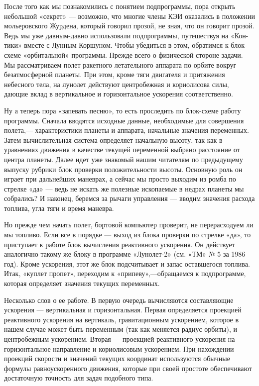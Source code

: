 \documentclass[11pt,a4paper,oneside]{article}
\begin{document}
После того как мы познакомились с понятием подпрограммы, пора открыть небольшой «секрет» — возможно, что многие члены КЭИ оказались в положении мольеровского Журдена, который говорил прозой, не зная, что он говорит прозой. Ведь мы уже давным-давно использовали подпрограммы, путешествуя на «Кон-тики» вместе с Лунным Коршуном. Чтобы убедиться в этом, обратимся к блок-схеме «орбитальной» программы. Прежде всего о физической стороне задачи. Мы рассматриваем полет ракетного летательного аппарата по орбите вокруг безатмосферной планеты. При этом, кроме тяги двигателя и притяжения небесного тела, на лунолет действуют центробежная и кориолисова силы, дающие вклад в вертикальное и горизонтальное ускорения соответственно.

Ну а теперь пора «запевать песню», то есть проследить по блок-схеме работу программы. Сначала вводятся исходные данные, необходимые для совершения полета,— характеристики планеты и аппарата, начальные значения переменных. Затем вычислительная система определяет начальную высоту, так как в уравнениях движения в качестве текущей переменной выбрано расстояние от центра планеты. Далее идет уже знакомый нашим читателям по предыдущему выпуску рубрики блок проверки положительности высоты. Основную роль он играет при дальнейших маневрах, а сейчас мы просто выходим из ромба по стрелке «да» — ведь не искать же полезные ископаемые в недрах планеты мы собрались? И наконец, беремся за рычаги управления — вводим значения расхода топлива, угла тяги и время маневра.

Но прежде чем начать полет, бортовой компьютер проверит, не перерасходуем ли мы топливо. Если все в порядке — выход из блока проверки по стрелке «да», то приступает к работе блок вычисления реактивного ускорения. Он действует аналогично такому же блоку в программе «Лунолет-2» (см. «ТМ» № 5 за 1986 год). Кроме ускорения, этот же блок подсчитывает и запас оставшегося топлива. Итак, «куплет пропет», переходим к «припеву»,—обращаемся к подпрограмме, которая определяет значения текущих переменных.

Несколько слов о ее работе. В первую очередь вычисляются составляющие ускорения — вертикальная и горизонтальная. Первая определяется проекцией реактивного ускорения на вертикаль, гравитационным ускорением, которое в нашем случае может быть переменным (так как меняется радиус орбиты), и центробежным ускорением. Вторая — проекцией реактивного ускорения на горизонтальное направление и кориолисовым ускорением. При нахождении проекций скорости и значений текущих координат используются обычные формулы равноускоренного движения, которые при своей простоте обеспечивают достаточную точность для задач подобного типа.
\end{document}
